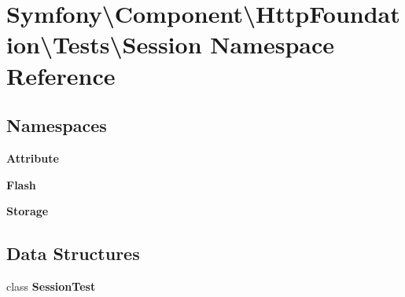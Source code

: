 \section{Symfony\textbackslash{}Component\textbackslash{}Http\+Foundation\textbackslash{}Tests\textbackslash{}Session Namespace Reference}
\label{namespace_symfony_1_1_component_1_1_http_foundation_1_1_tests_1_1_session}
\subsection*{Namespaces}
\begin{DoxyCompactItemize}
\item 
 {\bf Attribute}
\item 
 {\bf Flash}
\item 
 {\bf Storage}
\end{DoxyCompactItemize}
\subsection*{Data Structures}
\begin{DoxyCompactItemize}
\item 
class {\bf Session\+Test}
\end{DoxyCompactItemize}
